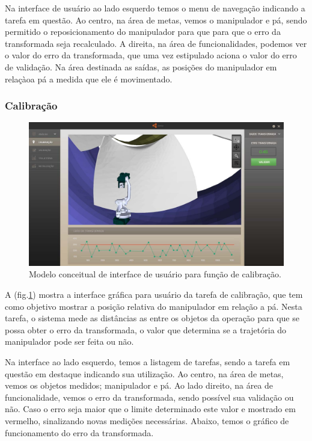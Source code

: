 \documentclass[12pt,a4paper]{article}
\begin{document}
Na interface de usuário ao lado esquerdo temos o menu de navegação indicando a
tarefa em questão. Ao centro, na área de metas, vemos o manipulador e pá, sendo
permitido o reposicionamento do manipulador para que para que o erro da
transformada seja recalculado. A direita, na área de funcionalidades, podemos
ver o valor do erro da transformada, que uma vez estipulado aciona o valor do 
erro de validação. Na área destinada as saídas, as posições do manipulador em
relaçàoa pá a medida que ele é movimentado.



\subsubsection {Calibração}

\begin{figure}[H]
\begin{center}
  \includegraphics[width=.95\columnwidth]{figs/Calibracao.jpg}
  \caption{Modelo conceitual de interface de usuário para função de calibração.}
  \label{fig:Interface_calibracao}
\end{center}
\end{figure} 

A (fig.\ref{fig:Interface_calibracao}) mostra a interface gráfica para usuário
da tarefa de calibração, que tem como objetivo mostrar a posição relativa do
manipulador em relação a pá. Nesta tarefa, o sistema mede as distâncias as entre
os objetos da operação para que se possa obter o erro da transformada, o valor
que determina se a trajetória do manipulador pode ser feita ou não. 

Na interface ao lado esquerdo, temos a listagem de tarefas, sendo a tarefa em
questão em destaque indicando sua utilização. Ao centro, na área de metas, vemos os
objetos medidos; manipulador e pá. Ao lado direito, na área de funcionalidade, 
vemos o erro da transformada, sendo possível sua validação ou não.
Caso o erro seja maior que o limite determinado este valor e mostrado em
vermelho, sinalizando novas medições necessárias. Abaixo, temos o
gráfico de funcionamento do erro da transformada.
\end{document}
